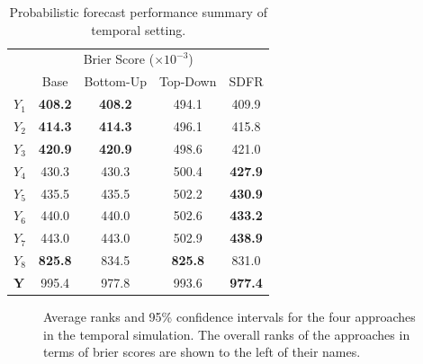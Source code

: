 \documentclass[a4paper,review,12pt,authoryear]{elsarticle}
\newcommand{\bY}{\mathbf{Y}}
\begin{document}
     \begin{table}
     \centering
     \caption{\label{tab:sim_temporal_res_dist} Probabilistic forecast performance summary of temporal setting.}
     \begin{tabular}{lcccc}
     \toprule
     \multicolumn{5}{c}{Brier Score ($\times 10^{-3}$)}\\ 
      & Base & Bottom-Up & Top-Down & SDFR \\\midrule
     $Y_1$ & \textbf{408.2} & \textbf{408.2} & 494.1 & 409.9 \\
     $Y_2$ & \textbf{414.3} & \textbf{414.3} & 496.1 & 415.8\\
     $Y_3$ & \textbf{420.9} & \textbf{420.9} & 498.6 & 421.0\\
     $Y_4$ & 430.3 & 430.3  & 500.4          & \textbf{427.9}\\
     $Y_5$ & 435.5 & 435.5  & 502.2          & \textbf{430.9} \\
     $Y_6$ & 440.0 & 440.0  & 502.6          & \textbf{433.2} \\
     $Y_7$ & 443.0 & 443.0  & 502.9          & \textbf{438.9} \\
     $Y_8$ & \textbf{825.8} & 834.5          & \textbf{825.8} & 831.0\\
     $\bY$ & 995.4 & 977.8  & 993.6          & \textbf{977.4} \\
     \bottomrule
     \end{tabular}
     \end{table}
     
     
     \begin{figure}
       \caption{\label{fig:sim_temporal_mcb_prob}Average ranks and 95\% confidence intervals for the four approaches in the temporal simulation. The overall ranks of the approaches in terms of brier scores are shown to the left of their names.}
        \qquad
        \qquad
     \end{figure}     
\end{document}
